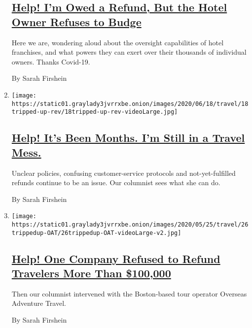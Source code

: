 \begin{enumerate}
  \hypertarget{help-im-owed-a-refund-but-the-hotel-owner-refuses-to-budge}{%
  \subsection{\texorpdfstring{\href{/2020/07/07/travel/virus-refunds-hotel-franchises.html}{Help!
  I'm Owed a Refund, But the Hotel Owner Refuses to
  Budge}}{Help! I'm Owed a Refund, But the Hotel Owner Refuses to Budge}}\label{help-im-owed-a-refund-but-the-hotel-owner-refuses-to-budge}}

  Here we are, wondering aloud about the oversight capabilities of hotel
  franchises, and what powers they can exert over their thousands of
  individual owners. Thanks Covid-19.

  By Sarah Firshein
\item
  \texttt{[image: https://static01.graylady3jvrrxbe.onion/images/2020/06/18/travel/18tripped-up-rev/18tripped-up-rev-videoLarge.jpg]}

  \hypertarget{help-its-been-months-im-still-in-a-travel-mess}{%
  \subsection{\texorpdfstring{\href{/2020/06/18/travel/travel-refunds-airlines.html}{Help!
  It's Been Months. I'm Still in a Travel
  Mess.}}{Help! It's Been Months. I'm Still in a Travel Mess.}}\label{help-its-been-months-im-still-in-a-travel-mess}}

  Unclear policies, confusing customer-service protocols and
  not-yet-fulfilled refunds continue to be an issue. Our columnist sees
  what she can do.

  By Sarah Firshein
\item
  \texttt{[image: https://static01.graylady3jvrrxbe.onion/images/2020/05/25/travel/26trippedup-OAT/26trippedup-OAT-videoLarge-v2.jpg]}

  \hypertarget{help-one-company-refused-to-refund-travelers-more-than-100000}{%
  \subsection{\texorpdfstring{\href{/2020/05/25/travel/coronavirus-refunds-overseas-adventure-travel.html}{Help!
  One Company Refused to Refund Travelers More Than
  \$100,000}}{Help! One Company Refused to Refund Travelers More Than \$100,000}}\label{help-one-company-refused-to-refund-travelers-more-than-100000}}

  Then our columnist intervened with the Boston-based tour operator
  Overseas Adventure Travel.

  By Sarah Firshein
\end{enumerate}

